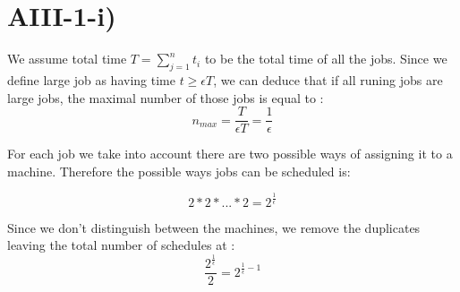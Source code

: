 \section*{AIII-1-i)}
\label{approx-3-1-i}

We assume total time $ T = \sum_{j=1}^{n} t_i $ to be the total time of all the jobs.
Since we define large job as having time  $ t \ge \epsilon T $,
we can deduce that if all runing jobs are large jobs, the maximal number of those jobs is
equal to :
$$ n_{max} = \frac{T}{\epsilon T} = \frac{1}{\epsilon} $$

For each job we take into account there are two possible ways of assigning it to a machine.
Therefore the possible ways jobs can be scheduled is:

$$ 2*2* ... *2 = 2^{\frac{1}{\epsilon}} $$

Since we don't distinguish between the machines, we remove the duplicates leaving the 
total number of schedules at :
$$ \frac{2^\frac{1}{\epsilon}}{2} = 2^{\frac{1}{\epsilon}-1} $$
